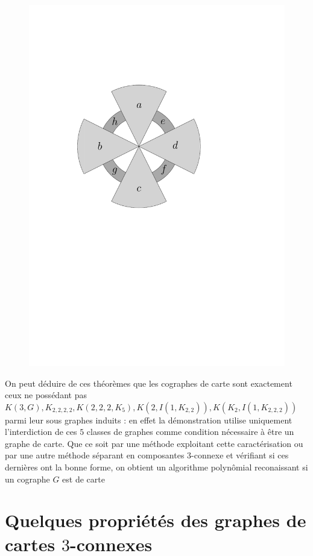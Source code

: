 \documentclass{scrartcl}
\begin{document}
\begin{flushleft}
\begin{figure}[h]
\begin{center}
        \includegraphics[page = \ipeFigcographsepind, scale = 0.6]{figs}
    \end{center}
\end{figure}

On peut déduire de ces théorèmes que les cographes de carte sont exactement ceux ne possédant pas $K(3, G), K_{2,2,2,2},
K(2,2,2,K_5), K(2, I(1, K_{2,2})), K(K_2, I(1, K_{2,2,2}))$
parmi leur sous graphes induits : en effet la démonstration utilise uniquement l'interdiction de ces $5$ classes de graphes comme condition nécessaire
à être un graphe de carte. Que ce soit par une méthode exploitant cette caractérisation ou par une autre méthode séparant en composantes
$3$-connexe et vérifiant si ces dernières ont la bonne forme, on obtient un algorithme polynômial reconaissant si un cographe $G$ est de carte

\section{Quelques propriétés des graphes de cartes $3$-connexes}


\end{flushleft}
\end{document}
